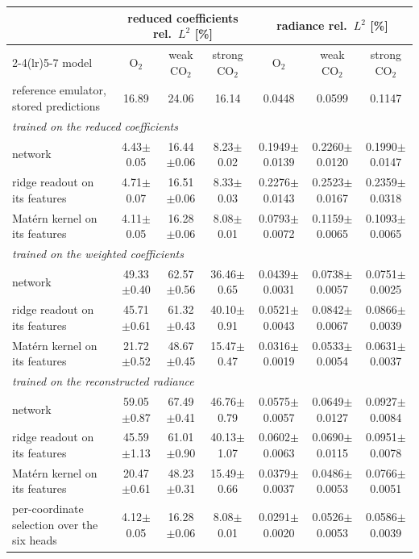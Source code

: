 \begin{tabular}{lcccccc}
\toprule
 & \multicolumn{3}{c}{reduced coefficients rel.\ $L^2$ [\%]} & \multicolumn{3}{c}{radiance rel.\ $L^2$ [\%]} \\
\cmidrule(lr){2-4}\cmidrule(lr){5-7}
model & O$_2$ & weak CO$_2$ & strong CO$_2$ & O$_2$ & weak CO$_2$ & strong CO$_2$ \\
\midrule
reference emulator, stored predictions & 16.89 & 24.06 & 16.14 & 0.0448 & 0.0599 & 0.1147 \\
\multicolumn{7}{l}{\emph{trained on the reduced coefficients}} \\
network & 4.43$\pm$0.05 & 16.44$\pm$0.06 & 8.23$\pm$0.02 & 0.1949$\pm$0.0139 & 0.2260$\pm$0.0120 & 0.1990$\pm$0.0147 \\
\quad ridge readout on its features & 4.71$\pm$0.07 & 16.51$\pm$0.06 & 8.33$\pm$0.03 & 0.2276$\pm$0.0143 & 0.2523$\pm$0.0167 & 0.2359$\pm$0.0318 \\
\quad Mat\'ern kernel on its features & 4.11$\pm$0.05 & 16.28$\pm$0.06 & 8.08$\pm$0.01 & 0.0793$\pm$0.0072 & 0.1159$\pm$0.0065 & 0.1093$\pm$0.0065 \\
\multicolumn{7}{l}{\emph{trained on the weighted coefficients}} \\
network & 49.33$\pm$0.40 & 62.57$\pm$0.56 & 36.46$\pm$0.65 & 0.0439$\pm$0.0031 & 0.0738$\pm$0.0057 & 0.0751$\pm$0.0025 \\
\quad ridge readout on its features & 45.71$\pm$0.61 & 61.32$\pm$0.43 & 40.10$\pm$0.91 & 0.0521$\pm$0.0043 & 0.0842$\pm$0.0067 & 0.0866$\pm$0.0039 \\
\quad Mat\'ern kernel on its features & 21.72$\pm$0.52 & 48.67$\pm$0.45 & 15.47$\pm$0.47 & 0.0316$\pm$0.0019 & 0.0533$\pm$0.0054 & 0.0631$\pm$0.0037 \\
\multicolumn{7}{l}{\emph{trained on the reconstructed radiance}} \\
network & 59.05$\pm$0.87 & 67.49$\pm$0.41 & 46.76$\pm$0.79 & 0.0575$\pm$0.0057 & 0.0649$\pm$0.0127 & 0.0927$\pm$0.0084 \\
\quad ridge readout on its features & 45.59$\pm$1.13 & 61.01$\pm$0.90 & 40.13$\pm$1.07 & 0.0602$\pm$0.0063 & 0.0690$\pm$0.0115 & 0.0951$\pm$0.0078 \\
\quad Mat\'ern kernel on its features & 20.47$\pm$0.61 & 48.23$\pm$0.31 & 15.49$\pm$0.66 & 0.0379$\pm$0.0037 & 0.0486$\pm$0.0053 & 0.0766$\pm$0.0051 \\
\midrule
per-coordinate selection over the six heads & 4.12$\pm$0.05 & 16.28$\pm$0.06 & 8.08$\pm$0.01 & 0.0291$\pm$0.0020 & 0.0526$\pm$0.0053 & 0.0586$\pm$0.0039 \\
\bottomrule
\end{tabular}
